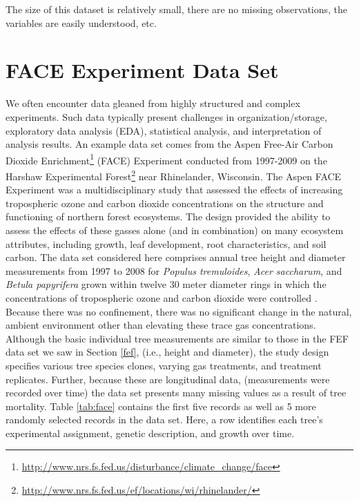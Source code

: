 \documentclass[]{krantz}
\renewcommand{\href}[2]{#2\footnote{\url{#1}}}
\begin{document}
The size of this dataset is relatively small, there are no missing observations, the variables are easily understood, etc.

\hypertarget{face-experiment-data-set}{%
\section{FACE Experiment Data Set}\label{face-experiment-data-set}}

We often encounter data gleaned from highly structured and complex experiments. Such data typically present challenges in organization/storage, exploratory data analysis (EDA), statistical analysis, and interpretation of analysis results. An example data set comes from the Aspen \href{http://www.nrs.fs.fed.us/disturbance/climate_change/face}{Free-Air Carbon Dioxide Enrichment} (FACE) Experiment conducted from 1997-2009 on the \href{http://www.nrs.fs.fed.us/ef/locations/wi/rhinelander/}{Harshaw Experimental Forest} near Rhinelander, Wisconsin. The Aspen FACE Experiment was a multidisciplinary study that assessed the effects of increasing tropospheric ozone and carbon dioxide concentrations on the structure and functioning of northern forest ecosystems. The design provided the ability to assess the effects of these gasses alone (and in combination) on many ecosystem attributes, including growth, leaf development, root characteristics, and soil carbon. The data set considered here comprises annual tree height and diameter measurements from 1997 to 2008 for \emph{Populus tremuloides}, \emph{Acer saccharum}, and \emph{Betula papyrifera} grown within twelve 30 meter diameter rings in which the concentrations of tropospheric ozone and carbon dioxide were controlled \citet{Kubiske2013}. Because there was no confinement, there was no significant change in the natural, ambient environment other than elevating these trace gas concentrations. Although the basic individual tree measurements are similar to those in the FEF data set we saw in Section \ref{fef}, (i.e., height and diameter), the study design specifies various tree species clones, varying gas treatments, and treatment replicates. Further, because these are longitudinal data, (measurements were recorded over time) the data set presents many missing values as a result of tree mortality. Table \ref{tab:face} contains the first five records as well as 5 more randomly selected records in the data set. Here, a row identifies each tree's experimental assignment, genetic description, and growth over time.
\end{document}
